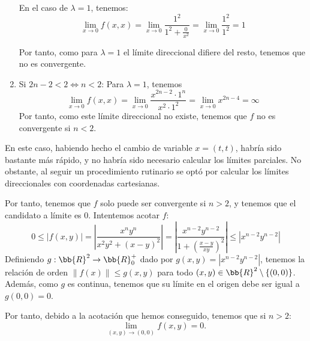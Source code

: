 \begin{ejercicio}
\begin{enumerate}
        En el caso de $\lambda=1$, tenemos:
        $$\lim\limits_{x\to 0}f(x,x)
        =\lim\limits_{x\to 0}\dfrac{1^2}{1^2 + \frac{0}{x^{2}}}
        =\lim\limits_{x\to 0}\dfrac{1^2}{1^2} = 1
        $$

        Por tanto, como para $\lambda=1$ el límite direccional difiere del resto, tenemos que no es convergente.

        \item Si $2n-2<2\Longleftrightarrow n<2$: Para $\lambda=1$, tenemos
        \begin{equation*}
            \lim\limits_{x\to 0}f(x,x)
            =\lim_{x\to 0} \frac{x^{2n-2}\cdot 1^n}{x^2\cdot 1^2}
            =\lim_{x\to 0} x^{2n-4} = \infty
        \end{equation*}
        Por tanto, como este límite direccional no existe, tenemos que $f$ no es convergente si $n<2$.
    \end{enumerate}
    \begin{observacion}
        En este caso, habiendo hecho el cambio de variable $x=(t,t)$, habría sido bastante más rápido, y no habría sido necesario calcular los límites parciales. No obstante, al seguir un procedimiento rutinario se optó por calcular los límites direccionales con coordenadas cartesianas.
    \end{observacion}

    Por tanto, tenemos que $f$ solo puede ser convergente si $n>2$, y tenemos que el candidato a límite es $0$. Intentemos acotar $f$:
    \begin{equation*}
        0\leq \left|f(x,y)\right|
        = \left|\frac{x^ny^n}{x^2y^2+(x-y)^2}\right|
        = \left|\frac{x^{n-2}y^{n-2}}{1+\left(\frac{x-y}{xy}\right)^2}\right|\leq |x^{n-2}y^{n-2}|
    \end{equation*}
    Definiendo $g:\bb{R}^2\to \bb{R}_0^+$ dado por $g(x,y)=|x^{n-2}y^{n-2}|$, tenemos la relación de orden $\|f(x)\|\leq g(x,y)$ para todo $(x,y)\in \bb{R}^2\setminus \{(0,0)\}$. Además, como $g$ es continua, tenemos que su límite en el origen debe ser igual a $g(0,0)=0$.

    Por tanto, debido a la acotación que hemos conseguido, tenemos que si $n>2$: $$\lim\limits_{(x,y)\to (0,0)}f(x,y)=0.$$
\end{ejercicio}

